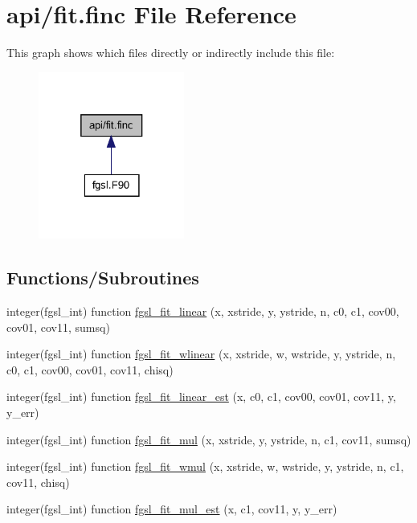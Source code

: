 \hypertarget{fit_8finc}{}\section{api/fit.finc File Reference}
\label{fit_8finc}
This graph shows which files directly or indirectly include this file\+:\nopagebreak
\begin{figure}[H]
\begin{center}
\leavevmode
\includegraphics[width=136pt]{fit_8finc__dep__incl}
\end{center}
\end{figure}
\subsection*{Functions/\+Subroutines}
\begin{DoxyCompactItemize}
\item 
integer(fgsl\+\_\+int) function \hyperlink{fit_8finc_a7dbfda6efd2515a9e142a12c4c995cde}{fgsl\+\_\+fit\+\_\+linear} (x, xstride, y, ystride, n, c0, c1, cov00, cov01, cov11, sumsq)
\item 
integer(fgsl\+\_\+int) function \hyperlink{fit_8finc_a19abc39bc86162b79068c44626edb286}{fgsl\+\_\+fit\+\_\+wlinear} (x, xstride, w, wstride, y, ystride, n, c0, c1, cov00, cov01, cov11, chisq)
\item 
integer(fgsl\+\_\+int) function \hyperlink{fit_8finc_a20cd5e248d653b461490237eb98254e1}{fgsl\+\_\+fit\+\_\+linear\+\_\+est} (x, c0, c1, cov00, cov01, cov11, y, y\+\_\+err)
\item 
integer(fgsl\+\_\+int) function \hyperlink{fit_8finc_a127e1658f8bbdb60cb8bb05fe99f3330}{fgsl\+\_\+fit\+\_\+mul} (x, xstride, y, ystride, n, c1, cov11, sumsq)
\item 
integer(fgsl\+\_\+int) function \hyperlink{fit_8finc_ac340f74c0c45fa11d42988d8c8961c3d}{fgsl\+\_\+fit\+\_\+wmul} (x, xstride, w, wstride, y, ystride, n, c1, cov11, chisq)
\item 
integer(fgsl\+\_\+int) function \hyperlink{fit_8finc_a20a41d8704fb027d985e0450d6328a75}{fgsl\+\_\+fit\+\_\+mul\+\_\+est} (x, c1, cov11, y, y\+\_\+err)
\end{DoxyCompactItemize}


